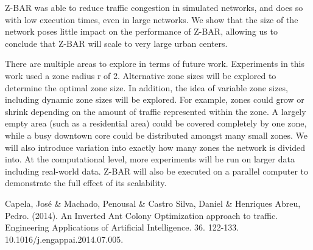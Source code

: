 \documentclass[conference]{IEEEtran}
\begin{document}
Z-BAR was able to reduce traffic congestion in simulated networks, and does so with low execution times, even in large networks. We show that the size of the network poses little impact on the performance of Z-BAR, allowing us to conclude that Z-BAR will scale to very large urban centers.

There are multiple areas to explore in terms of future work. Experiments in this work used a zone radius r of 2. Alternative zone sizes will be explored to determine the optimal zone size. In addition, the idea of variable zone sizes, including dynamic zone sizes will be explored. For example, zones could grow or shrink depending on the amount of traffic represented within the zone. A largely empty area (such as a residential area) could be covered completely by one zone, while a busy downtown core could be distributed amongst many small zones. We will also introduce variation into exactly how many zones the network is divided into. At the computational level, more experiments will be run on larger data including real-world data. Z-BAR will also be executed on a parallel computer to demonstrate the full effect of its scalability.

\begin{thebibliography}{1}
 Capela, José \& Machado, Penousal \& Castro Silva, Daniel \& Henriques Abreu, Pedro. (2014). An Inverted Ant Colony Optimization approach to traffic. Engineering Applications of Artificial Intelligence. 36. 122-133. 10.1016/j.engappai.2014.07.005. 
\bibitem{}
\bibitem{}
\bibitem{}
\bibitem{}
\bibitem{}
\bibitem{}
\bibitem{}
\bibitem{}
\bibitem{}
\end{thebibliography}
\end{document}

